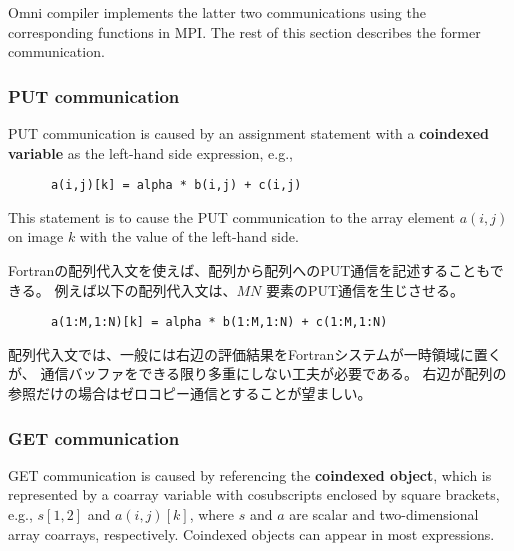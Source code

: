 Omni compiler implements the latter two communications using the corresponding 
functions in MPI. The rest of this section describes the former communication.

\subsubsection{PUT communication}\label{sec:PUT}

PUT communication is caused by an assignment statement with a {\bf coindexed variable} 
as the left-hand side expression, e.g.,
\begin{verbatim}
      a(i,j)[k] = alpha * b(i,j) + c(i,j)
\end{verbatim}
This statement is to cause the PUT communication to the array element $a(i,j)$ on image $k$
with the value of the left-hand side.

Fortranの配列代入文を使えば、配列から配列へのPUT通信を記述することもできる。
例えば以下の配列代入文は、$M N$ 要素のPUT通信を生じさせる。
\begin{verbatim}
      a(1:M,1:N)[k] = alpha * b(1:M,1:N) + c(1:M,1:N)
\end{verbatim}

\requirement
配列代入文では、一般には右辺の評価結果をFortranシステムが一時領域に置くが、
通信バッファをできる限り多重にしない工夫が必要である。
右辺が配列の参照だけの場合はゼロコピー通信とすることが望ましい。



\subsubsection{GET communication}\label{sec:GET}

GET communication is caused by referencing the {\bf coindexed object}, 
which is represented by a coarray variable with cosubscripts enclosed by square brackets, 
e.g., $s[1,2]$ and $a(i,j)[k]$, where $s$ and $a$ are scalar and two-dimensional array coarrays,
respectively.
Coindexed objects can appear in most expressions.


